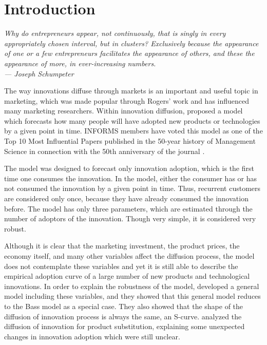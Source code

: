 

\chapter{Introduction}

\bigskip

\begin{flushright}{\slshape
    {Why do entrepreneurs appear, not continuously, that is singly in every appropriately chosen interval, but in clusters? Exclusively because the appearance of one or a few entrepreneurs facilitates the appearance of others, and these the appearance of more, in ever-increasing numbers.}
	\\ \medskip
    --- Joseph Schumpeter}
\end{flushright}
\bigskip
\bigskip


The way innovations diffuse through markets is an important and useful topic in marketing, which was made popular through Rogers' work \citep{rogers1962diffusion} and has influenced many marketing researchers. Within innovation diffusion, \citet{bass1969} proposed a model which forecasts how many people will have adopted new products or technologies by a given point in time. INFORMS members have voted this model as one of the Top 10 Most Influential Papers published in the 50-year history of Management Science in connection with the 50th anniversary of the journal \citep{bass2004comments}.

The \citet{bass1969} model was designed to forecast only innovation adoption, which is the first time one consumes the innovation. In the model, either the consumer has or has not consumed the innovation by a given point in time. Thus, recurrent customers are considered only once, because they have already consumed the innovation before. The model has only three parameters, which are estimated through the number of adoptors of the innovation. Though very simple, it is considered very robust.

Although it is clear that the marketing investment, the product prices, the economy itself, and many other variables affect the diffusion process, the \citet{bass1969} model does not contemplate these variables and yet it is still able to describe the empirical adoption curve of a large number of new products and technological innovations. In order to explain the robustness of the model, \citet{bass1994bass} developed a general model including these variables, and they showed that this general model reduces to the Bass model as a special case. They also showed that the shape of the diffusion of innovation process is always the same, an S-curve. \citet{norton1987diffusion} analyzed the diffusion of innovation for product substitution, explaining some unexpected changes in innovation adoption which were still unclear.

